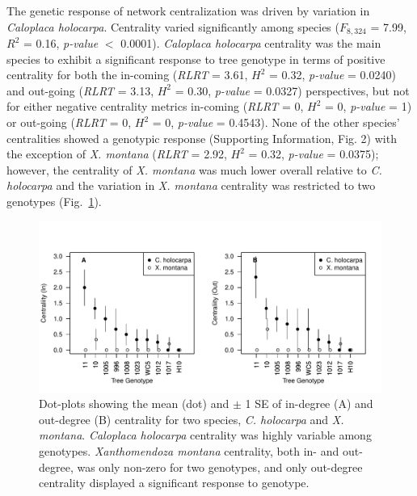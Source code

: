 \documentclass[fleqn,12pt]{olplainarticle}
\begin{document}


The genetic response of network centralization was driven by variation
in \textit{Caloplaca holocarpa}. Centrality varied significantly among
species ($F_{8, 324}$ = 7.99, $R^2$ = 0.16, \textit{p-value} $<$
0.0001). \textit{Caloplaca holocarpa} centrality was the main species
to exhibit a significant response to tree genotype in terms of
positive centrality for both the in-coming (\textit{RLRT} = 3.61,
$H^2$ = 0.32, \textit{p-value} = 0.0240) and out-going (\textit{RLRT}
= 3.13, $H^2$ = 0.30, \textit{p-value} = 0.0327) perspectives, but not
for either negative centrality metrics in-coming (\textit{RLRT} = 0,
$H^2$ = 0, \textit{p-value} = 1) or out-going (\textit{RLRT} = 0,
$H^2$ = 0, \textit{p-value} = 0.4543). None of the other species'
centralities showed a genotypic response (Supporting Information,
Fig. 2) with the exception of \textit{X. montana} (\textit{RLRT} =
2.92, $H^2$ = 0.32, \textit{p-value} = 0.0375); however, the
centrality of \textit{X. montana} was much lower overall relative to
\textit{C. holocarpa} and the variation in \textit{X. montana}
centrality was restricted to two genotypes
(Fig.~\ref{fig:geno_sppcen}).



\begin{figure}[ht]
\centering
\includegraphics[width=\linewidth]{figures/geno_sppcen.pdf}
\caption{Dot-plots showing the mean (dot) and $\pm$ 1 SE of in-degree
  (A) and out-degree (B) centrality for two species,
  \textit{C. holocarpa} and \textit{X. montana}. \textit{Caloplaca
    holocarpa} centrality was highly variable among
  genotypes. \textit{Xanthomendoza montana} centrality, both in- and
  out-degree, was only non-zero for two genotypes, and only out-degree
  centrality displayed a significant response to genotype.}
\label{fig:geno_sppcen}
\end{figure}
\end{document}
